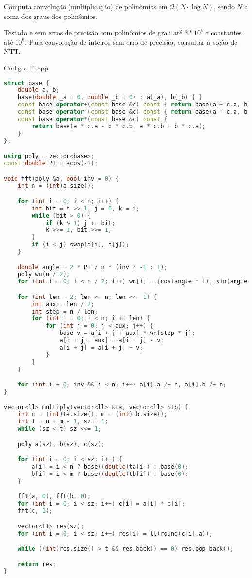 \documentclass[10pt, a4paper, oneside]{book}
\begin{document}
Computa convolução (multiplicação) de polinômios em $\mathcal{O}(N \cdot \log N)$, sendo $N$ a soma dos graus dos polinômios.



Testado e sem erros de precisão com polinômios de grau até $3 * 10^5$ e constantes até $10^6$. Para convolução de inteiros sem erro de precisão, consultar a seção de NTT.

\hfill

Codigo: fft.cpp

\begin{lstlisting}[language=C++]
struct base {
    double a, b;
    base(double _a = 0, double _b = 0) : a(_a), b(_b) { }
    const base operator+(const base &c) const { return base(a + c.a, b + c.b); }
    const base operator-(const base &c) const { return base(a - c.a, b - c.b); }
    const base operator*(const base &c) const {
        return base(a * c.a - b * c.b, a * c.b + b * c.a);
    }
};

using poly = vector<base>;
const double PI = acos(-1);

void fft(poly &a, bool inv = 0) {
    int n = (int)a.size();

    for (int i = 0; i < n; i++) {
        int bit = n >> 1, j = 0, k = i;
        while (bit > 0) {
            if (k & 1) j += bit;
            k >>= 1, bit >>= 1;
        }
        if (i < j) swap(a[i], a[j]);
    }

    double angle = 2 * PI / n * (inv ? -1 : 1);
    poly wn(n / 2);
    for (int i = 0; i < n / 2; i++) wn[i] = {cos(angle * i), sin(angle * i)};

    for (int len = 2; len <= n; len <<= 1) {
        int aux = len / 2;
        int step = n / len;
        for (int i = 0; i < n; i += len) {
            for (int j = 0; j < aux; j++) {
                base v = a[i + j + aux] * wn[step * j];
                a[i + j + aux] = a[i + j] - v;
                a[i + j] = a[i + j] + v;
            }
        }
    }

    for (int i = 0; inv && i < n; i++) a[i].a /= n, a[i].b /= n;
}

vector<ll> multiply(vector<ll> &ta, vector<ll> &tb) {
    int n = (int)ta.size(), m = (int)tb.size();
    int t = n + m - 1, sz = 1;
    while (sz < t) sz <<= 1;

    poly a(sz), b(sz), c(sz);

    for (int i = 0; i < sz; i++) {
        a[i] = i < n ? base((double)ta[i]) : base(0);
        b[i] = i < m ? base((double)tb[i]) : base(0);
    }

    fft(a, 0), fft(b, 0);
    for (int i = 0; i < sz; i++) c[i] = a[i] * b[i];
    fft(c, 1);

    vector<ll> res(sz);
    for (int i = 0; i < sz; i++) res[i] = ll(round(c[i].a));

    while ((int)res.size() > t && res.back() == 0) res.pop_back();

    return res;
}
\end{lstlisting}
\hfill
\end{document}
